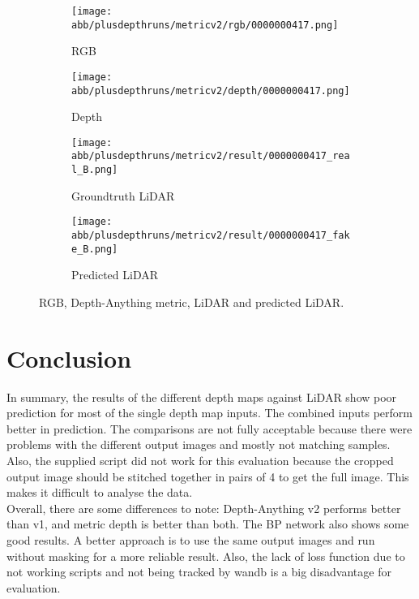 \begin{figure}[!ht]
	\centering
	
	\begin{subfigure}{0.4\textwidth}
		\centering
		\texttt{[image: abb/plusdepthruns/metricv2/rgb/0000000417.png]}
		\caption{RGB}
		\label{fig:bild1}
	\end{subfigure}
	
	\vspace{1em} 
	
	\begin{subfigure}{0.4\textwidth}
		\centering
		\texttt{[image: abb/plusdepthruns/metricv2/depth/0000000417.png]}
		\caption{Depth}
		\label{fig:bild2}
	\end{subfigure}
	
	\vspace{1em} 
	
	\begin{subfigure}{0.25\textwidth}
		\centering
		\texttt{[image: abb/plusdepthruns/metricv2/result/0000000417\_real\_B.png]}
		\caption{Groundtruth LiDAR}
		\label{fig:bild3}
	\end{subfigure}
	\begin{subfigure}{0.25\textwidth}
		\centering
		\texttt{[image: abb/plusdepthruns/metricv2/result/0000000417\_fake\_B.png]}
		\caption{Predicted LiDAR}
		\label{fig:bild4}
	\end{subfigure}
	
	\caption{RGB, Depth-Anything metric, LiDAR and predicted LiDAR.}
	\label{metric_rgbd}
\end{figure}
\chapter{Conclusion}
In summary, the results of the different depth maps against LiDAR show poor prediction for most of the single depth map inputs. The combined inputs perform better in prediction. The comparisons are not fully acceptable because there were problems with the different output images and mostly not matching samples. Also, the supplied script did not work for this evaluation because the cropped output image should be stitched together in pairs of 4 to get the full image. This makes it difficult to analyse the data. \newline \\Overall, there are some differences to note: Depth-Anything v2 performs better than v1, and metric depth is better than both. The BP network also shows some good results. A better approach is to use the same output images and run without masking for a more reliable result. Also, the lack of loss function due to not working scripts and not being tracked by wandb is a big disadvantage for evaluation. 
\newpage
